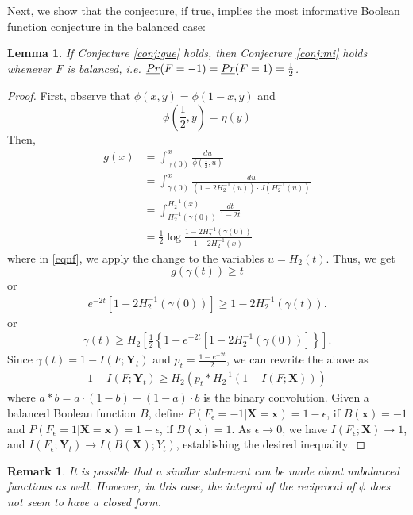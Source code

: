 \documentclass[conference,letterpaper,onecolumn]{IEEEtran}
\theoremstyle{plain}%
\newtheorem{lemma}[thm]{Lemma}
\newtheorem{rem}{Remark}
\newcommand{\bY}{\mathbf{Y}}
\newcommand{\bX}{\mathbf{X}}
\begin{document}
Next, we show that the conjecture, if true, implies the most informative Boolean function conjecture in the balanced case: 
\begin{lemma}
\label{lem:conjimpbal}
If Conjecture \ref{conj:gue} holds, then Conjecture \ref{conj:mi} holds whenever $F$ is balanced, i.e. $\emph{Pr}(F=-1)=\emph{Pr}(F=1)=\frac12$.
\end{lemma}
\begin{proof}
 First, observe that $\phi(x,y)=\phi(1-x,y)$ and
$$\phi\left(\frac12,y\right)=\eta(y)$$
Then,
{\begin{align}
g(x)&=\int_{\gamma(0)}^{x}\frac{du}{\phi(\frac12,u)}\nonumber
\\&=\int_{\gamma(0)}^{x}\frac{du}{(1-2H_2^{-1}(u))\cdot J(H_2^{-1}(u))}\nonumber
\\&=\int_{H_2^{-1}(\gamma(0))}^{H_2^{-1}(x)}\frac{dt}{1-2t}\label{eqnf}
\\&=\frac12\log\frac{1-2H_2^{-1}(\gamma(0))}{1-2H_2^{-1}(x)}\nonumber
\end{align}}
where in \eqref{eqnf}, we apply the change to the variables 
$u=H_2(t)$. Thus, we get
$$g(\gamma(t))\geq t$$
or
\begin{align}
    e^{-2t}\left[1-2H_2^{-1}(\gamma(0))\right]\geq 1-2H_2^{-1}(\gamma(t)).
\end{align}
or
\begin{align}
    \gamma(t)\geq H_2\left[\frac{1}{2}\left\{1-e^{-2t}\left[1-2H_2^{-1}(\gamma(0))\right]\right\}\right].
\end{align}
Since $\gamma(t)=1-I(F;\bY_t)$ and $p_t = \frac{1 - e^{-2t}}{2}$, we can rewrite the above as 
    \begin{align*}
       1 - I(F;\bY_t)\geq H_2(p_t \ast H_2^{-1}(1 - I(F;\bX)))
   \end{align*}
where $a\ast b = a\cdot(1-b) + (1-a)\cdot b$ is the binary convolution. Given a balanced Boolean function $B$, define $P(F_\epsilon=-1|\mathbf{X}=\mathbf{x}) = 1-\epsilon$, if $B(\mathbf{x})=-1$ and $P(F_\epsilon=1|\mathbf{X}=\mathbf{x}) = 1-\epsilon$, if $B(\mathbf{x})=1$. As $\epsilon \to 0$, we have $I(F_\epsilon;\bX)\to 1$, and $I(F_\epsilon;\bY_t) \to I(B(\bX);Y_t)$, establishing the desired inequality.
\end{proof}
\begin{rem}
    It is possible that a similar statement can be made about unbalanced functions as well. However, in this case, the integral of the reciprocal of $\phi$ does not seem to have a closed form. 
\end{rem}
\end{document}
